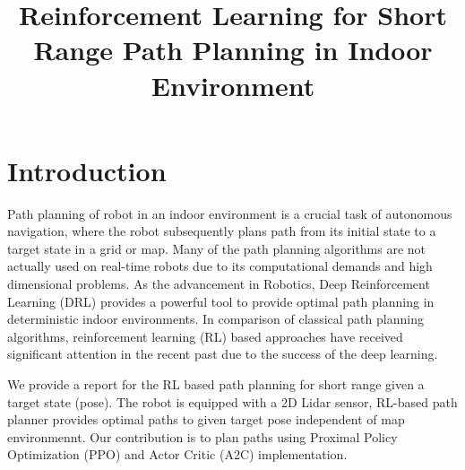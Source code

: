 \documentclass[conference]{IEEEtran}
\begin{document}
\title{Reinforcement Learning for Short Range Path Planning in Indoor Environment\\
{\footnotesize \textsuperscript{}}}

\author{
%
\and
%
\linebreakand
\and
{}
\and
{}
}

\maketitle
  



\section{Introduction}
 Path planning of robot in an indoor environment is a crucial task of autonomous navigation, where the robot subsequently plans path from its initial state to a target state in a grid or map. Many of the path planning algorithms are not actually used on real-time robots due to its computational demands and high dimensional problems. As the advancement in Robotics, Deep Reinforcement Learning (DRL) provides a powerful tool to provide optimal path planning in deterministic indoor environments. In comparison of classical path planning algorithms, reinforcement learning (RL) based approaches have received significant attention in the recent past due to the success of the deep learning. 
 \par We provide a report for the RL based path planning for short range given a target state (pose). The robot is equipped with a 2D Lidar sensor, RL-based path planner provides optimal paths to given target pose independent of map environmennt.
 Our contribution is to plan paths using Proximal Policy Optimization (PPO) and 
 Actor Critic (A2C) implementation.
\end{document}
